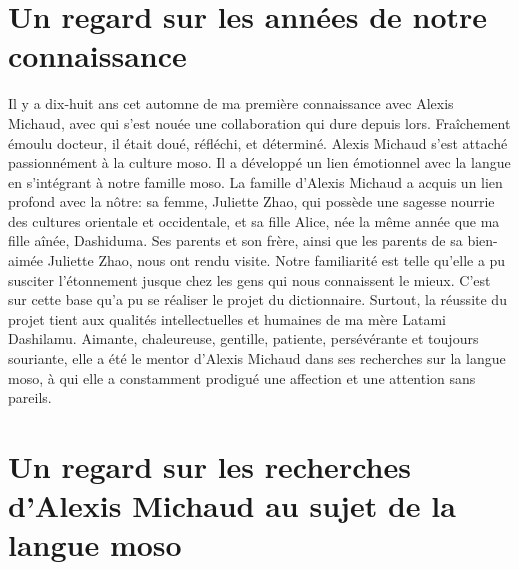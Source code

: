 \section*{Un regard sur les années de notre connaissance}

Il y a dix-huit ans cet automne de ma première connaissance avec Alexis Michaud, avec qui s’est nouée une collaboration qui dure depuis lors. Fraîchement émoulu docteur, il était doué, réfléchi, et déterminé. Alexis Michaud s’est attaché passionnément à la culture moso. Il a développé un lien émotionnel avec la langue en s'intégrant à notre famille moso. La famille d’Alexis Michaud a acquis un lien profond avec la nôtre: sa femme, Juliette Zhao, qui possède une sagesse nourrie des cultures orientale et occidentale, et sa fille Alice, née la même année que ma fille aînée, Dashiduma. Ses parents et son frère, ainsi que les parents de sa bien-aimée Juliette Zhao, nous ont rendu visite. Notre familiarité est telle qu’elle a pu susciter l’étonnement jusque chez les gens qui nous connaissent le mieux. C’est sur cette base qu’a pu se réaliser le projet du dictionnaire. Surtout, la réussite du projet tient aux qualités intellectuelles et humaines de ma mère Latami Dashilamu. Aimante, chaleureuse, gentille, patiente, persévérante et toujours souriante, elle a été le mentor d’Alexis Michaud dans ses recherches sur la langue moso, à qui elle a constamment prodigué une affection et une attention sans pareils.

\section*{Un regard sur les recherches d’Alexis Michaud au sujet de la langue moso}

